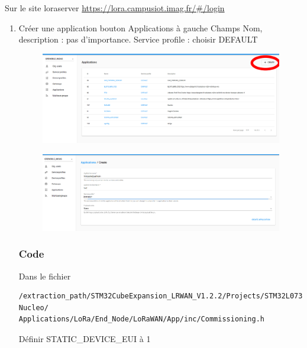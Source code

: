 \documentclass{article}
\begin{document}
\begin{itemize}
Sur le site loraserver \url{https://lora.campusiot.imag.fr/#/login}\\
\begin{enumerate}
    


\item Créer une application bouton Applications à gauche
Champs Nom, description : pas d'importance.
Service profile : choisir DEFAULT


 \begin{figure}[H]
\begin{center}
\advance\leftskip-3cm
\advance\rightskip-3cm
\includegraphics[keepaspectratio=true,scale=0.3]{loraserver_app_create.png}
\label{visina8}
\end{center}\end{figure}

\begin{figure}[H]
\begin{center}
\advance\leftskip-3cm
\advance\rightskip-3cm
\includegraphics[keepaspectratio=true,scale=0.3]{loraserver_application_form.png}
\label{visina8}
\end{center}\end{figure}




\subsubsection{Code}
Dans le fichier 
\begin{verbatim}
/extraction_path/STM32CubeExpansion_LRWAN_V1.2.2/Projects/STM32L073RZ-Nucleo/
Applications/LoRa/End_Node/LoRaWAN/App/inc/Commissioning.h
\end{verbatim}
Définir STATIC\_DEVICE\_EUI  à 1 \\



\end{enumerate}
\end{itemize}
\end{document}
